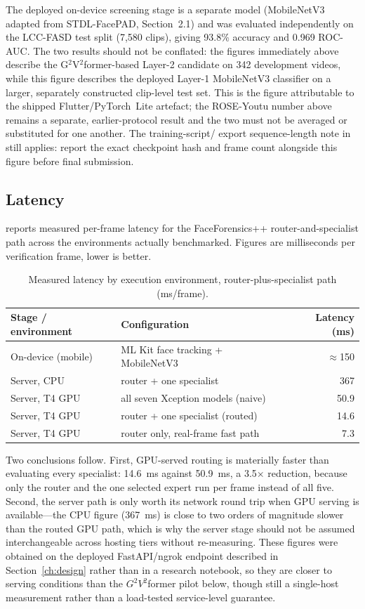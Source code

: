 The deployed on-device screening stage is a separate model (MobileNetV3 adapted
from STDL-FacePAD, Section~2.1) and was evaluated independently on the LCC-FASD
test split (7,580 clips), giving 93.8\% accuracy and 0.969 ROC-AUC. The two
results should not be conflated: the figures immediately above describe the
G$^2$V$^2$former-based Layer-2 candidate on 342 development videos, while this
figure describes the deployed Layer-1 MobileNetV3 classifier on a larger,
separately constructed clip-level test set.
This is the figure attributable to the shipped Flutter/PyTorch~Lite artefact;
the ROSE-Youtu number above remains a separate, earlier-protocol result and the
two must not be averaged or substituted for one another. The training-script/
export sequence-length note in  still applies: report the exact
checkpoint hash and frame count alongside this figure before final submission.

\subsection{Latency}

 reports measured per-frame latency for the FaceForensics++
router-and-specialist path across the environments actually benchmarked. Figures
are milliseconds per verification frame, lower is better.

\begin{table}[H]
\centering
\caption{Measured latency by execution environment, router-plus-specialist path
(ms/frame).}
\label{tab:latency}
\begin{tabular}{@{}llr@{}}
\toprule
Stage / environment & Configuration & Latency (ms) \\
\midrule
On-device (mobile) & ML Kit face tracking + MobileNetV3 & $\approx$150 \\
Server, CPU & router + one specialist & 367 \\
Server, T4 GPU & all seven Xception models (naive) & 50.9 \\
Server, T4 GPU & router + one specialist (routed) & 14.6 \\
Server, T4 GPU & router only, real-frame fast path & 7.3 \\
\bottomrule
\end{tabular}
\end{table}

Two conclusions follow. First, GPU-served routing is materially faster than
evaluating every specialist: 14.6~ms against 50.9~ms, a 3.5$\times$ reduction,
because only the router and the one selected expert run per frame instead of
all five. Second, the server path is only worth its network round trip when GPU
serving is available---the CPU figure (367~ms) is close to two orders of
magnitude slower than the routed GPU path, which is why the server stage should
not be assumed interchangeable across hosting tiers without re-measuring. These
figures were obtained on the deployed FastAPI/ngrok endpoint described in
Section~\ref{ch:design} rather than in a research notebook, so they are closer
to serving conditions than the $G^2V^2$former pilot below, though still a
single-host measurement rather than a load-tested service-level guarantee.

